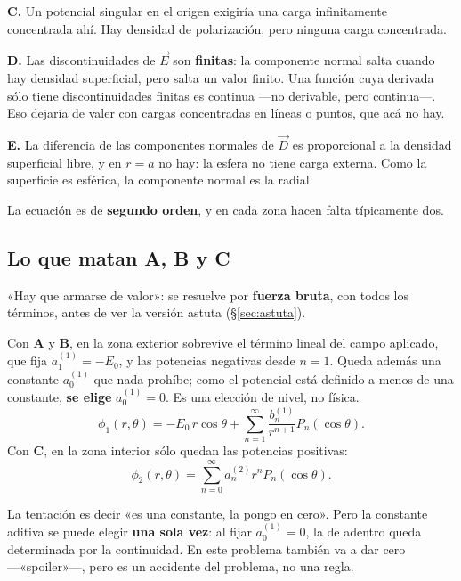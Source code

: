 \documentclass[12pt,a4paper]{article}
\begin{document}
\textbf{C.} Un potencial singular en el origen exigiría una carga infinitamente
concentrada ahí. Hay densidad de polarización, pero ninguna carga concentrada.

\textbf{D.} Las discontinuidades de $\vec E$ son \textbf{finitas}: la componente
normal salta cuando hay densidad superficial, pero salta un valor finito. Una
función cuya derivada sólo tiene discontinuidades finitas es continua ---no
derivable, pero continua---. Eso dejaría de valer con cargas concentradas en
líneas o puntos, que acá no hay.

\textbf{E.} La diferencia de las componentes normales de $\vec D$ es proporcional
a la densidad superficial libre, y en $r=a$ no hay: la esfera no tiene carga
externa. Como la superficie es esférica, la componente normal es la radial.

\begin{notebox}
La ecuación es de \textbf{segundo orden}, y en cada zona hacen falta típicamente
dos.
\end{notebox}

\subsection{Lo que matan A, B y C}

«Hay que armarse de valor»: se resuelve por \textbf{fuerza bruta}, con todos los
términos, antes de ver la versión astuta (§\ref{sec:astuta}).

Con \textbf{A} y \textbf{B}, en la zona exterior sobrevive el término lineal del
campo aplicado, que fija $a_1^{(1)} = -E_0$, y las potencias negativas desde
$n = 1$. Queda además una constante $a_0^{(1)}$ que nada prohíbe; como el
potencial está definido a menos de una constante, \textbf{se elige}
$a_0^{(1)} = 0$. Es una elección de nivel, no física.
\[
\phi_1(r,\theta) = -E_0\, r\cos\theta
+ \sum_{n=1}^{\infty} \frac{b_n^{(1)}}{r^{n+1}} P_n(\cos\theta).
\]
Con \textbf{C}, en la zona interior sólo quedan las potencias positivas:
\[
\phi_2(r,\theta) = \sum_{n=0}^{\infty} a_n^{(2)} r^{n} P_n(\cos\theta).
\]

\begin{warnbox}
La tentación es decir «es una constante, la pongo en cero». Pero la constante
aditiva se puede elegir \textbf{una sola vez}: al fijar $a_0^{(1)}=0$, la de
adentro queda determinada por la continuidad. En este problema también va a dar
cero ---«spoiler»---, pero es un accidente del problema, no una regla.
\end{warnbox}
\end{document}
